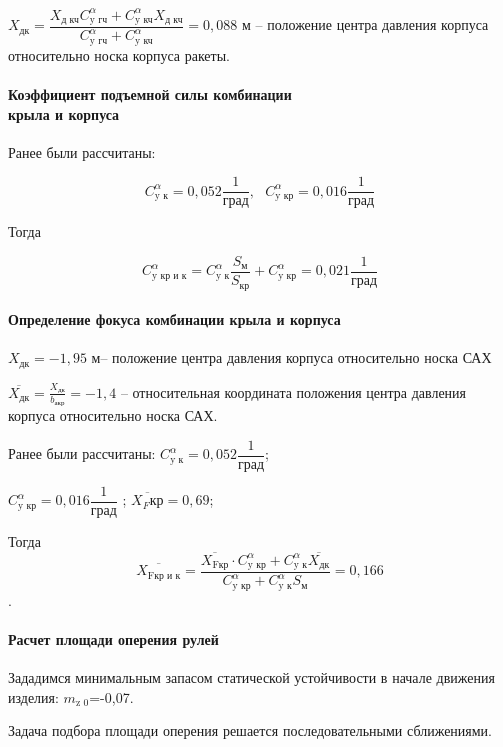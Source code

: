 $X_\text{дк}= \dfrac{X_\text{д кч} C_\text{y гч}^\alpha +C_\text{y кч}^\alpha X_\text{д кч} }{C_\text{y гч}^\alpha + C_\text{y кч}^\alpha } = 0,088$ м – положение центра давления корпуса относительно носка корпуса ракеты.

\clearpage
\paragraph{Коэффициент подъемной силы комбинации \\ крыла и корпуса}

Ранее были рассчитаны: 

$$C_\text{y к}^\alpha=0,052  \frac{1}{ \text{град} }, \text{  }  C_\text{y кр}^\alpha=0,016 \frac{1}{\text{град}} $$

Тогда

$$C_\text{y кр и к}^\alpha = C_\text{y к}^\alpha  \frac{S_\text{м}}{S_\text{кр}} + C_\text{y кр}^\alpha=0,021 \frac{1}{\text{град}}$$

\paragraph{Определение фокуса комбинации крыла и корпуса}

$X_\text{дк}=-1,95$ м– положение центра давления корпуса относительно носка САХ

$\overline{X_\text{дк}}= \frac{X_\text{дк}} {b_\text{акр}} =-1,4$ – относительная координата положения центра давления корпуса относительно носка САХ.

Ранее были рассчитаны: $C_\text{y к}^\alpha=0,052  \dfrac{1}{\text{град}} $;

$C_\text{y кр}^\alpha =0,016 \dfrac{1}{\text{град}}$ ; $\overline{X_F\text{кр}}=0,69$;

Тогда	$$\overline{X_\text{Fкр и к}} = \dfrac{\overline{X_\text{Fкр}} \cdot C_\text{y кр}^\alpha +  C_\text{y к}^\alpha \overline{X_\text{дк}} } {C_\text{y кр}^\alpha + C_\text{y к}^\alpha S_\text{м} }=0,166 $$.

\paragraph{Расчет площади оперения рулей}

Зададимся минимальным запасом статической устойчивости в начале движения изделия: $m_\text{z 0}$=-0,07.

Задача подбора площади оперения решается последовательными сближениями.

